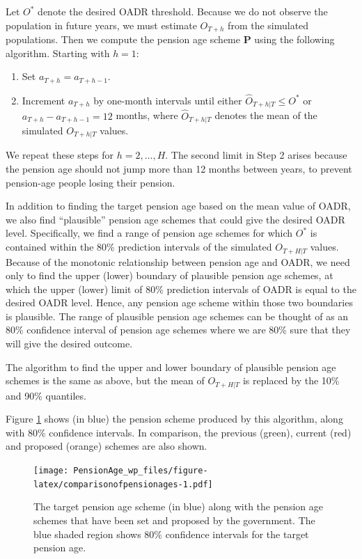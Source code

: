 \documentclass[11pt,a4paper,]{article}
\providecommand{\tightlist}{%
  \setlength{\itemsep}{0pt}\setlength{\parskip}{0pt}}
\begin{document}
Let \(O^*\) denote the desired OADR threshold. Because we do not observe the population in future years, we must estimate \(O_{T+h}\) from the simulated populations. Then we compute the pension age scheme \(\bm{P}\) using the following algorithm. Starting with \(h=1\):

\begin{enumerate}
\def\labelenumi{\arabic{enumi}.}
\tightlist
\item
  Set \(a_{T+h}=a_{T+h-1}\).
\item
  Increment \(a_{T+h}\) by one-month intervals until either \(\widehat{O}_{T+h|T} \le O^*\) or \(a_{T+h} - a_{T+h-1}=12\) months, where \(\widehat{O}_{T+h|T}\) denotes the mean of the simulated \(O_{T+h|T}\) values.
\end{enumerate}

We repeat these steps for \(h=2,\dots,H\). The second limit in Step 2 arises because the pension age should not jump more than 12 months between years, to prevent pension-age people losing their pension.

In addition to finding the target pension age based on the mean value of OADR, we also find ``plausible'' pension age schemes that could give the desired OADR level. Specifically, we find a range of pension age schemes for which \(O^*\) is contained within the 80\% prediction intervals of the simulated \(O_{T+H|T}\) values. Because of the monotonic relationship between pension age and OADR, we need only to find the upper (lower) boundary of plausible pension age schemes, at which the upper (lower) limit of 80\% prediction intervals of OADR is equal to the desired OADR level. Hence, any pension age scheme within those two boundaries is plausible. The range of plausible pension age schemes can be thought of as an 80\% confidence interval of pension age schemes where we are 80\% sure that they will give the desired outcome.

The algorithm to find the upper and lower boundary of plausible pension age schemes is the same as above, but the mean of \(O_{T+H|T}\) is replaced by the 10\% and 90\% quantiles.

Figure \ref{fig:comparisonofpensionages} shows (in blue) the pension scheme produced by this algorithm, along with 80\% confidence intervals. In comparison, the previous (green), current (red) and proposed (orange) schemes are also shown.

\begin{figure}
\centering
\texttt{[image: PensionAge\_wp\_files/figure-latex/comparisonofpensionages-1.pdf]}
\caption{\label{fig:comparisonofpensionages}The target pension age scheme (in blue) along with the pension age schemes that have been set and proposed by the government. The blue shaded region shows 80\% confidence intervals for the target pension age.}
\end{figure}
\end{document}
